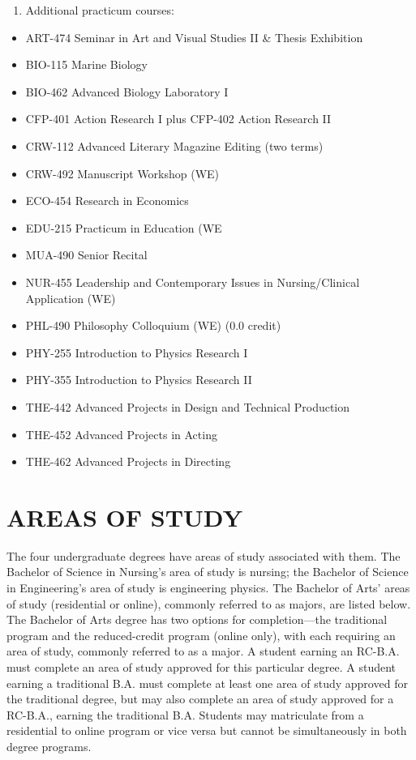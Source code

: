 \documentclass[
  letterpaper,
]{scrbook}
\providecommand{\tightlist}{%
  \setlength{\itemsep}{0pt}\setlength{\parskip}{0pt}}
\begin{document}
\begin{enumerate}
\def\labelenumi{\arabic{enumi}.}
\setcounter{enumi}{9}
\tightlist
\item
  Additional practicum courses:
\end{enumerate}

\begin{itemize}
\tightlist
\item
  ART-474 Seminar in Art and Visual Studies II \& Thesis Exhibition
\item
  BIO-115 Marine Biology
\item
  BIO-462 Advanced Biology Laboratory I
\item
  CFP-401 Action Research I plus CFP-402 Action Research II
\item
  CRW-112 Advanced Literary Magazine Editing (two terms)
\item
  CRW-492 Manuscript Workshop (WE)
\item
  ECO-454 Research in Economics
\item
  EDU-215 Practicum in Education (WE
\item
  MUA-490 Senior Recital
\item
  NUR-455 Leadership and Contemporary Issues in Nursing/Clinical
  Application (WE)
\item
  PHL-490 Philosophy Colloquium (WE) (0.0 credit)
\item
  PHY-255 Introduction to Physics Research I
\item
  PHY-355 Introduction to Physics Research II
\item
  THE-442 Advanced Projects in Design and Technical Production
\item
  THE-452 Advanced Projects in Acting
\item
  THE-462 Advanced Projects in Directing
\end{itemize}

\section{AREAS OF STUDY}\label{areas-of-study}

The four undergraduate degrees have areas of study associated with them.
The Bachelor of Science in Nursing's area of study is nursing; the
Bachelor of Science in Engineering's area of study is engineering
physics. The Bachelor of Arts' areas of study (residential or online),
commonly referred to as majors, are listed below. The Bachelor of Arts
degree has two options for completion---the traditional program and the
reduced-credit program (online only), with each requiring an area of
study, commonly referred to as a major. A student earning an RC-B.A.
must complete an area of study approved for this particular degree. A
student earning a traditional B.A. must complete at least one area of
study approved for the traditional degree, but may also complete an area
of study approved for a RC-B.A., earning the traditional B.A. Students
may matriculate from a residential to online program or vice versa but
cannot be simultaneously in both degree programs.
\end{document}
